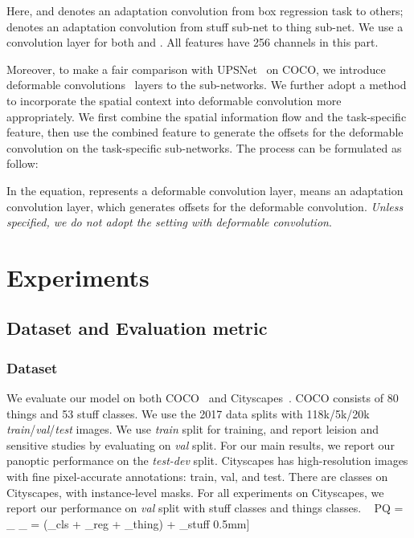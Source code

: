 \documentclass[journal,final]{IEEEtran}
\begin{document}
Here,  and  denotes an adaptation convolution from box regression task to others;  denotes an adaptation convolution from stuff sub-net to thing sub-net. We use a  convolution layer for both  and . All features have 256 channels in this part.

Moreover, to make a fair comparison with UPSNet~\cite{upsnet} on COCO, we introduce deformable convolutions~\cite{deformable} layers to the sub-networks. We further adopt a method to incorporate the spatial context into deformable convolution more appropriately. We first combine the spatial information flow and the task-specific feature, then use the combined feature to generate the offsets for the deformable convolution on the task-specific sub-networks. The process can be formulated as follow:

In the equation,  represents a deformable convolution layer,  means an adaptation convolution layer, which generates offsets for the deformable convolution. {\em Unless specified, we do not adopt the setting with deformable convolution}.

\section{Experiments} \label{sec4}
\subsection{Dataset and Evaluation metric}
\subsubsection{Dataset} 
We evaluate our model on both COCO~\cite{coco} and Cityscapes~\cite{cityscapes}. COCO consists of 80 things and 53 stuff classes. We use the 2017 data splits with 118k/5k/20k {\em train}/{\em val}/{\em test} images. We use {\em train} split for training, and report leision and sensitive studies by evaluating on {\em val} split. For our main results, we report our panoptic performance on the {\em test-dev} split. Cityscapes has  high-resolution images with fine pixel-accurate annotations:  train,  val, and  test. There are  classes on Cityscapes,  with instance-level masks. For all experiments on Cityscapes, we report our performance on {\em val} split with  stuff classes and  things classes.
\ \label{eq5}
PQ = _{} \times {}_{}
 \label{eq4}
 = (_{cls} + _{reg} + _{thing}) + \lambda \cdot {}_{stuff}
0.5mm]
\end{document}
